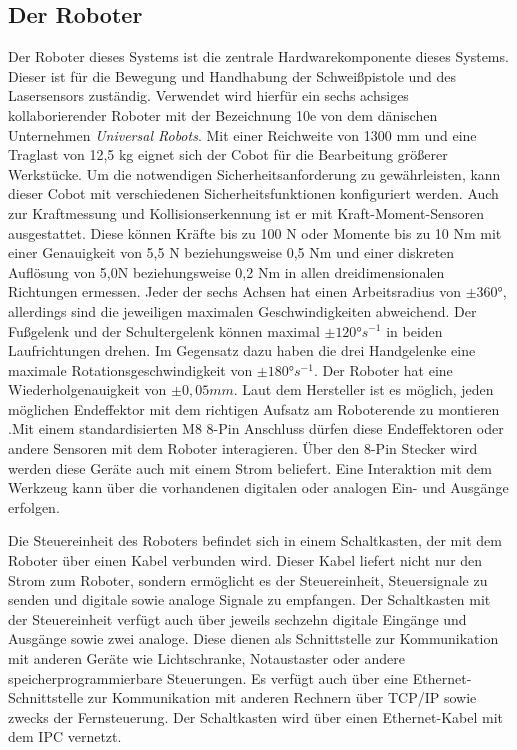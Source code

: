 \subsection{Der Roboter}
Der Roboter dieses Systems ist die zentrale Hardwarekomponente dieses Systems. Dieser ist für die Bewegung und Handhabung der Schweißpistole und des Lasersensors zuständig. Verwendet wird hierfür ein sechs achsiges kollaborierender Roboter mit der Bezeichnung 10e von dem dänischen Unternehmen \emph{Universal Robots}. Mit einer Reichweite von 1300 mm und eine Traglast von 12,5 kg eignet sich der Cobot für die Bearbeitung größerer Werkstücke. Um die notwendigen Sicherheitsanforderung zu gewährleisten, kann dieser Cobot mit verschiedenen Sicherheitsfunktionen konfiguriert werden. Auch zur Kraftmessung und Kollisionserkennung ist er mit Kraft-Moment-Sensoren ausgestattet. Diese können Kräfte bis zu 100 N oder Momente bis zu 10 Nm mit einer Genauigkeit von 5,5 N beziehungsweise 0,5 Nm und einer diskreten Auflösung von 5,0N beziehungsweise 0,2 Nm in allen dreidimensionalen Richtungen ermessen. Jeder der sechs Achsen hat einen Arbeitsradius von $\pm \ang{360}$, allerdings sind die jeweiligen maximalen Geschwindigkeiten abweichend. Der Fußgelenk und der Schultergelenk können maximal $\pm \ang{120} s^{-1}$ in beiden Laufrichtungen drehen. Im Gegensatz dazu haben die drei Handgelenke eine maximale Rotationsgeschwindigkeit von $\pm \ang{180} s^{-1}$. Der Roboter hat eine Wiederholgenauigkeit von $\pm 0,05 mm$. Laut dem Hersteller ist es möglich, jeden möglichen Endeffektor mit dem richtigen Aufsatz am Roboterende zu montieren .Mit einem standardisierten M8 8-Pin Anschluss dürfen diese Endeffektoren oder andere Sensoren mit dem Roboter interagieren. Über den 8-Pin Stecker wird werden diese Geräte auch mit einem Strom beliefert. Eine Interaktion mit dem Werkzeug kann über die vorhandenen digitalen oder analogen Ein- und Ausgänge erfolgen. 

Die Steuereinheit des Roboters befindet sich in einem Schaltkasten, der mit dem Roboter über einen Kabel verbunden wird. Dieser Kabel liefert nicht nur den Strom zum Roboter, sondern ermöglicht es der Steuereinheit, Steuersignale zu senden und digitale sowie analoge Signale zu empfangen. Der Schaltkasten mit der Steuereinheit verfügt auch über jeweils sechzehn digitale Eingänge und Ausgänge sowie zwei analoge. Diese dienen als Schnittstelle zur Kommunikation mit anderen Geräte wie Lichtschranke, Notaustaster oder andere speicherprogrammierbare Steuerungen. Es verfügt auch über eine Ethernet-Schnittstelle zur Kommunikation mit anderen Rechnern über TCP/IP sowie zwecks der Fernsteuerung. Der Schaltkasten wird über einen Ethernet-Kabel mit dem IPC vernetzt.

